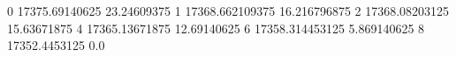 0 17375.69140625 23.24609375
1 17368.662109375 16.216796875
2 17368.08203125 15.63671875
4 17365.13671875 12.69140625
6 17358.314453125 5.869140625
8 17352.4453125 0.0
